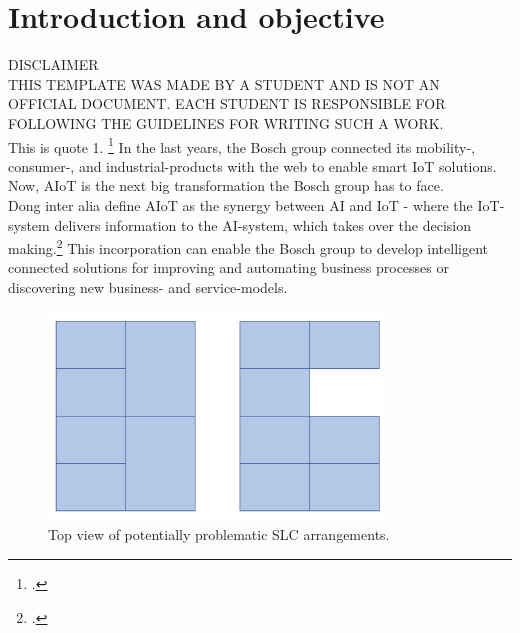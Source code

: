 \chapter{Introduction and objective}

DISCLAIMER\\
THIS TEMPLATE WAS MADE BY A STUDENT AND IS NOT AN OFFICIAL DOCUMENT.
EACH STUDENT IS RESPONSIBLE FOR FOLLOWING THE GUIDELINES FOR WRITING SUCH A WORK.\\

This is quote 1. \footcite[][p. 31]{annual_report_2020}
In the last years, the Bosch group connected its mobility-, consumer-, and industrial-products with the web to enable smart \ac{IoT} solutions. Now, \ac{AIoT} is the next big transformation the Bosch group has to face. \\
Dong inter alia define \ac{AIoT} as the synergy between \ac{AI} and \ac{IoT} - where the \ac{IoT}-system delivers information to the \ac{AI}-system, which takes over the decision making.\footcite[Cf.][p. 1]{AIoT} This incorporation can enable the Bosch group to develop intelligent connected solutions for improving and automating business processes or discovering new business- and service-models.\\
\begin{figure}[H]
	\centering
	\includegraphics[width=0.8\textwidth]{graphics/structure_top.png}
	\caption[Top view of potentially problematic \ac{SLC} arrangements.]{Top view of potentially problematic \ac{SLC} arrangements.\footnotemark}
	\label{abb:structure_top}
\end{figure}


	
	